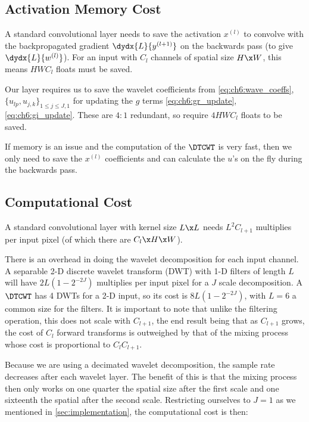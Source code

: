 \subsection{Activation Memory Cost}\label{sec:ch6:act_memory}
A standard convolutional layer needs to save the activation $x^{(l)}$ to
convolve with the backpropagated gradient $\dydx{L}{y^{(l+1)}}$ on the backwards
pass (to give $\dydx{L}{w^{(l)}}$). For an input with $C_l$ channels of spatial
size $H\x W$, this means $HWC_l$ floats must be saved. 

Our layer requires us to save the wavelet coefficients from \eqref{eq:ch6:wave_coeffs}, 
$\{u_{lp}, u_{j,k}\}_{1\leq j \leq J, 1}$ for updating the $g$ terms 
\eqref{eq:ch6:gr_update}, \eqref{eq:ch6:gi_update}.
These are $4:1$ redundant, so require $4HWC_l$ floats to be saved.

If memory is an issue and the computation of the $\DTCWT$ is very fast, then we
only need to save the $x^(l)$ coefficients and can calculate the $u$'s on the
fly during the backwards pass. 

\subsection{Computational Cost}\label{sec:ch6:computation}
A standard convolutional layer with kernel size $L\x L$ needs $L^2C_{l+1}$
multiplies per input pixel (of which there are $C_{l}\x H\x W$).

There is an overhead in doing the wavelet decomposition for each input channel.
A separable 2-D discrete wavelet transform (DWT) with 1-D filters of length $L$
will have $2L\left(1-2^{-2J}\right)$ multiplies per input pixel for a $J$ scale
decomposition. A $\DTCWT$ has 4 DWTs for a 2-D input, so its cost is
$8L\left(1-2^{-2J}\right)$, with $L=6$ a common size for the filters. It is
important to note that unlike the filtering operation, this does not scale with
$C_{l+1}$, the end result being that as $C_{l+1}$ grows, the cost of $C_l$
forward transforms is outweighed by that of the mixing process whose cost is
proportional to $C_l C_{l+1}$.

Because we are using a decimated wavelet decomposition, the sample rate
decreases after each wavelet layer. The benefit of this is that the mixing
process then only works on one quarter the spatial size after the first scale
and one sixteenth the spatial after the second scale. Restricting ourselves to
$J=1$ as we mentioned in \autoref{sec:implementation}, the computational cost is
then:

